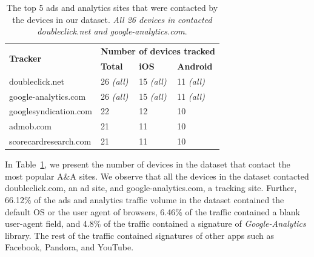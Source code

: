 \begin{table}
\centering
\begin{small}
\begin{tabular}{|p{}|p{}|p{}|p{}|}
\hline
\multirow{2}{*}{\bf Tracker} & \multicolumn{3}{c|}{\bf Number of devices tracked}\tabularnewline
\cline{2-4}
                      &  {\bf Total} & {\bf iOS} & {\bf Android} \tabularnewline
\hline
doubleclick.net       & 26 {\em(all)} & 15 {\em(all)} & 11 {\em(all)} \tabularnewline
\hline
google-analytics.com  & 26 {\em(all)} & 15 {\em(all)}  & 11 {\em(all)} \tabularnewline
\hline
googlesyndication.com & 22 & 12 & 10 \tabularnewline
\hline
admob.com             & 21 & 11 & 10 \tabularnewline
\hline
scorecardresearch.com &  21 & 11 & 10 \tabularnewline
\hline
\end{tabular}
\end{small}
\caption{The top 5 ads and analytics sites that were contacted by the devices in our dataset.
\emph{All 26 devices in} \mobWild \emph{contacted doubleclick.net and google-analytics.com}.}
\vspace{\postfigspace}
\label{tab:top-trackers}
\end{table}

In Table~\ref{tab:top-trackers}, we present the number of devices in the \mobWild dataset that contact the most popular A\&A sites.
We observe that all the devices in the \mobWild dataset contacted doubleclick.com, an ad site, and google-analytics.com, a tracking site. 
Further, 66.12\% of the ads and analytics traffic volume in the \mobWild dataset contained the default OS \useragent or the user agent of browsers, 6.46\% of the traffic contained a blank user-agent field, and 4.8\% of the traffic contained a signature of \emph{Google-Analytics} library.
The rest of the traffic contained signatures of other apps such as Facebook, Pandora, and YouTube.







